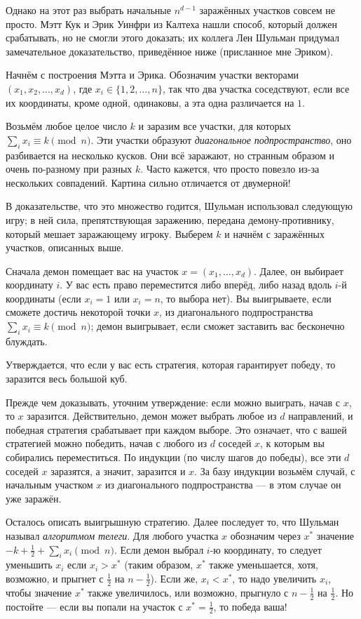Однако на этот раз выбрать начальные $n^{d-1}$ заражённых участков совсем не просто.
Мэтт Кук и Эрик Уинфри из Калтеха нашли способ, который должен срабатывать, но не смогли этого доказать;
их коллега Лен Шульман придумал замечательное доказательство, приведённое ниже (присланное мне Эриком).

Начнём с построения Мэтта и Эрика.
Обозначим участки векторами $(x_1 , x_2 , \dots , x_d )$, где $x_i \in \{1, 2, \dots , n\}$, так что два участка соседствуют, 
если все их координаты, кроме одной, одинаковы, а эта одна различается на $1$.

Возьмём любое целое число $k$ и заразим все участки, для которых $\sum_i x_i \equiv k\pmod n$.
Эти участки образуют \emph{диагональное подпространство}, оно разбивается на несколько кусков.
Они всё заражают, но странным образом и очень по-разному при разных $k$.
Часто кажется, что просто повезло из-за нескольких совпадений. 
Картина сильно отличается от двумерной!

В доказательстве, что это множество годится, Шульман использовал следующую игру;
в ней сила, препятствующая заражению, передана демону-противнику, который мешает заражающему игроку.
Выберем $k$ и начнём с заражённых участков, описанных выше.

Сначала демон помещает вас на участок $x = (x_1, \dots,x_d )$.
Далее, он выбирает координату $i$.
У вас есть право переместится либо вперёд, либо назад вдоль $i$-й координаты (если $x_i=1$ или $x_i=n$, то выбора нет).
Вы выигрываете, если сможете достичь некоторой точки $x$, из диагонального подпространства $\sum_i x_i \equiv k\pmod n$;
демон выигрывает, если сможет заставить вас бесконечно блуждать.

Утверждается, что если у вас есть стратегия, которая гарантирует победу, то заразится весь большой куб.

Прежде чем доказывать, уточним утверждение: если можно выиграть, начав с $x$, то $x$ заразится.
Действительно, демон может выбрать любое из $d$ направлений,
и победная стратегия срабатывает при каждом выборе.
Это означает, что с вашей стратегией можно победить, начав с любого из $d$ соседей $x$, к которым вы собирались переместиться.
По индукции (по числу шагов до победы), все эти $d$ соседей $x$ заразятся, а значит, заразится и $x$.
За базу индукции возьмём случай, с начальным участком $x$ из диагонального подпространства --- в этом случае он уже заражён.

Осталось описать выигрышную стратегию.
Далее последует то, что Шульман называл \emph{алгоритмом телеги}.
Для любого участка $x$ обозначим через $x^*$ значение $-k + \tfrac12 + \sum_i x_i \pmod n$.
Если демон выбрал $i$-ю координату, то следует уменьшить $x_i$ если $x_i > x^*$ (таким образом, $x^*$ также уменьшается, хотя, возможно, и прыгнет с $\tfrac12$ на $n - \tfrac12$).
Если же, $x_i < x^*$, то надо увеличить $x_i$, чтобы значение $x^*$ также увеличилось, или возможно, прыгнуло с $n - \tfrac12$ на $\tfrac12$.
Но постойте --- если вы попали на участок с $x^* = \tfrac12$, то победа ваша!

